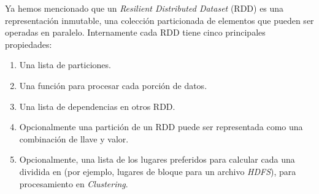   Ya hemos mencionado que un \emph{Resilient Distributed Dataset} (RDD) es una representación inmutable, una colección particionada de elementos que pueden ser operadas en paralelo. Internamente cada RDD tiene cinco principales propiedades:


  \begin{enumerate}
    \item Una lista de particiones.
    \item Una función para procesar cada porción de datos.
    \item Una lista de dependencias en otros RDD. 
    \item Opcionalmente una partición de un RDD puede ser representada como una combinación de llave y valor. 
    \item Opcionalmente, una lista de los lugares preferidos para calcular cada una dividida en (por ejemplo, lugares de bloque para un archivo \emph{HDFS}), para procesamiento en \emph{Clustering}.

  \end{enumerate}




















